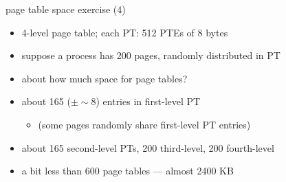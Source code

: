 \begin{frame}{page table space exercise (4)}
\begin{itemize}
\item 4-level page table; each PT: 512 PTEs of 8 bytes
\item suppose a process has 200 pages, randomly distributed in PT
\item about how much space for page tables?
\item<2-> about 165 ($\pm \sim 8$) entries in first-level PT
    \begin{itemize}
        \item (some pages randomly share first-level PT entries)
    \end{itemize}
\item<2-> about 165 second-level PTs, 200 third-level, 200 fourth-level
\item<2-> a bit less than 600 page tables --- almost 2400 KB
\end{itemize}
\end{frame}
